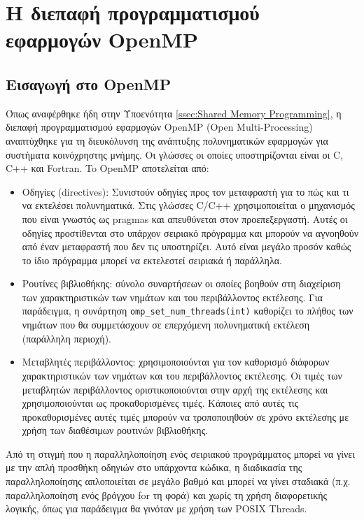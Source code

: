 \chapter{Η διεπαφή προγραμματισμού εφαρμογών OpenMP}
\label{ch:OpenMP API}

\section{Εισαγωγή στο OpenMP}
\label{sec:Introduction to OpenMP}
Όπως αναφέρθηκε ήδη στην Υποενότητα \ref{ssec:Shared Memory Programming}, η διεπαφή προγραμματισμού εφαρμογών OpenMP (Open Multi-Processing) αναπτύχθηκε για τη διευκόλυνση της ανάπτυξης πολυνηματικών εφαρμογών για συστήματα κοινόχρηστης μνήμης. Οι γλώσσες οι οποίες υποστηρίζονται είναι οι C, C++ και Fortran.
To OpenMP αποτελείται από:
\begin{itemize}
	\item Oδηγίες (directives): Συνιστούν οδηγίες προς τον μεταφραστή για το πώς και τι να εκτελέσει πολυνηματικά. Στις γλώσσες C/C++ χρησιμοποιείται ο μηχανισμός που είναι γνωστός ως pragmas και απευθύνεται στον προεπεξεργαστή. Αυτές οι οδηγίες προστίθενται στο υπάρχον σειριακό πρόγραμμα και μπορούν να αγνοηθούν από έναν μεταφραστή που δεν τις υποστηρίζει. Αυτό είναι μεγάλο προσόν καθώς το ίδιο πρόγραμμα μπορεί να εκτελεστεί σειριακά ή παράλληλα.
	\item Ρουτίνες βιβλιοθήκης: σύνολο συναρτήσεων οι οποίες βοηθούν στη διαχείριση των χαρακτηριστικών των νημάτων και του περιβάλλοντος εκτέλεσης. Για παράδειγμα, η συνάρτηση \texttt{omp\_set\_num\_threads(int)} καθορίζει το πλήθος των νημάτων που θα συμμετάσχουν σε επερχόμενη πολυνηματική εκτέλεση (παράλληλη περιοχή).
	\item Μεταβλητές περιβάλλοντος: χρησιμοποιούνται για τον καθορισμό διάφορων χαρακτηριστικών των νημάτων και του περιβάλλοντος εκτέλεσης. Οι τιμές των μεταβλητών περιβάλλοντος οριστικοποιούνται στην αρχή της εκτέλεσης και χρησιμοποιούνται ως προκαθορισμένες τιμές. Κάποιες από αυτές τις προκαθορισμένες αυτές τιμές μπορούν να τροποποιηθούν σε χρόνο εκτέλεσης με χρήση των διαθέσιμων ρουτινών βιβλιοθήκης.
\end{itemize}

Από τη στιγμή που η παραλληλοποίηση ενός σειριακού προγράμματος μπορεί να γίνει με την απλή προσθήκη οδηγιών στο υπάρχοντα κώδικα, η διαδικασία της παραλληλοποίησης απλοποιείται σε μεγάλο βαθμό και μπορεί να γίνει σταδιακά (π.χ. παραλληλοποίηση ενός βρόγχου for τη φορά) και χωρίς τη χρήση διαφορετικής λογικής, όπως για παράδειγμα θα γινόταν με χρήση των POSIX Threads. 

